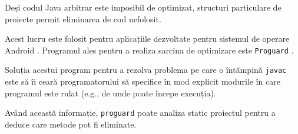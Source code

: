 Deși codul Java arbitrar este imposibil de optimizat, structuri
particulare de proiecte permit eliminarea de cod nefolosit.

Acest lucru este folosit pentru aplicațiile dezvoltate pentru
sistemul de operare Android \cite{android_proguard}.
Programul ales pentru a realiza sarcina de optimizare este
\texttt{Proguard} \cite{proguard}.

Soluția acestui program pentru a rezolva problema pe care o
întămpină \texttt{javac} este să îi ceară programatorului să
specifice în mod explicit modurile în care programul este rulat
(e.g., de unde poate începe execuția).

Având această informație, \texttt{proguard} poate analiza static
proiectul pentru a deduce care metode pot fi eliminate.
